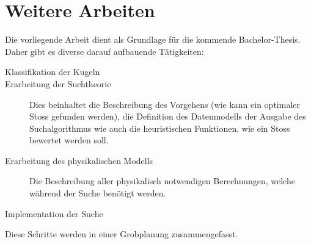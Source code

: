 \chapter{Weitere Arbeiten}
Die vorliegende Arbeit dient als Grundlage für die kommende Bachelor-Thesis. Daher gibt es diverse darauf aufbauende
Tätigkeiten:
\begin{description}
    \item[Klassifikation der Kugeln]
    \item[Erarbeitung der Suchtheorie] Dies beinhaltet die Beschreibung des Vorgehens (wie kann ein optimaler Stoss gefunden werden),
    die Definition des Datenmodells der Ausgabe des Suchalgorithmus wie auch die heuristischen Funktionen, wie ein Stoss bewertet werden
    soll.
    \item[Erarbeitung des physikalischen Modells] Die Beschreibung aller physikalisch notwendigen Berechnungen, welche während
    der Suche benötigt werden.
    \item[Implementation der Suche]
\end{description}
Diese Schritte werden in einer Grobplanung zusammengefasst.